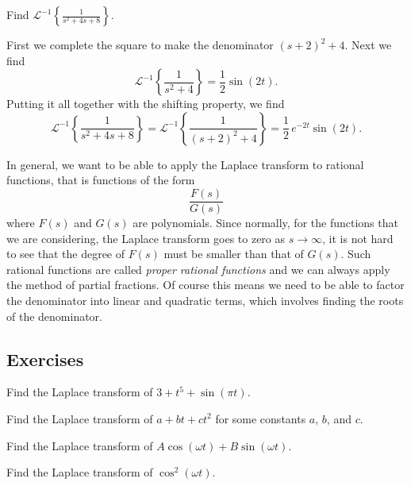 \documentclass[12pt]{book}
\begin{document}
\begin{example}
Find
${\mathcal{L}}^{-1} \left\{ \frac{1}{s^2+4s+8} \right\}$.

First we complete the square to make the denominator ${(s+2)}^2+4$.  
Next we find
\begin{equation*}
{\mathcal{L}}^{-1} \left\{ \frac{1}{s^2+4} \right\}
=
\frac{1}{2} \sin (2t) .
\end{equation*}
Putting it all together with the shifting property, we find
\begin{equation*}
{\mathcal{L}}^{-1} \left\{ \frac{1}{s^2+4s+8} \right\} = 
{\mathcal{L}}^{-1} \left\{ \frac{1}{{(s+2)}^2+4} \right\}
=
\frac{1}{2}\,e^{-2t} \sin (2t) .
\end{equation*}
\end{example}

In general, we want to be able to apply the Laplace transform to
rational functions, that is functions of the form
\begin{equation*}
\frac{F(s)}{G(s)}
\end{equation*}
where $F(s)$ and $G(s)$ are polynomials.  Since normally, for the functions
that we are considering, the Laplace transform goes
to zero as $s \to \infty$, it is not hard to see that the degree of $F(s)$
must be smaller than that of $G(s)$.  Such rational functions
are called \emph{proper rational functions}
and we can always apply the method of partial fractions.  Of
course this means we need to be able to factor the denominator into
linear and quadratic terms, which involves finding the roots of the
denominator.

\subsection{Exercises}

\begin{exercise}
Find the Laplace transform of $3+t^5+\sin (\pi t)$.
\end{exercise}

\begin{exercise}
Find the Laplace transform of $a+bt+ct^2$ for some constants $a$, $b$, and
$c$.
\end{exercise}

\begin{exercise}
Find the Laplace transform of $A \cos (\omega t) + B \sin (\omega t)$.
\end{exercise}

\begin{exercise}
Find the Laplace transform of $\cos^2 (\omega t)$.
\end{exercise}
\end{document}
